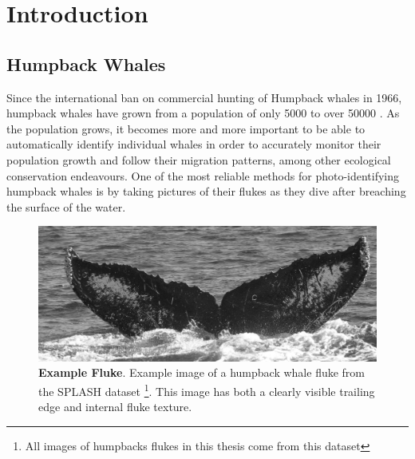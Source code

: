  
\chapter{Introduction} \label{sec:introduction}
 
\section{Humpback Whales}

Since the international ban on commercial hunting of Humpback whales in 1966, humpback whales have grown from a population of only 5000 \cite{baker1993abundant} to over 50000 \cite{branch2011humpback}. 
As the population grows, it becomes more and more important to be able to automatically identify individual whales in order to accurately monitor their population growth and follow their migration patterns, among other ecological conservation endeavours.
One of the most reliable methods for photo-identifying humpback whales is by taking pictures of their flukes as they dive after breaching the surface of the water.

\begin{figure}[t]%
\centering
\includegraphics[width=1.0\textwidth]{../images/fluke_aid88_goodmatching.jpg}
\caption[]{\textbf{Example Fluke}. Example image of a humpback whale fluke from the SPLASH \cite{calambokidis2008splash} dataset \footnote{All images of humpbacks flukes in this thesis come from this dataset}. This image has both a clearly visible trailing edge and internal fluke texture.}
\label{fig:example_fluke}
\end{figure}

